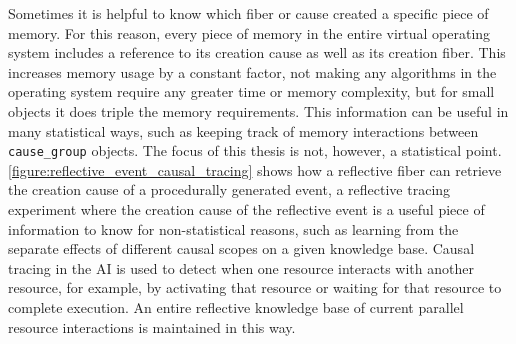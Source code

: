 Sometimes it is helpful to know which fiber or cause created a
specific piece of memory.  For this reason, every piece of memory in
the entire virtual operating system includes a reference to its
creation cause as well as its creation fiber.  This increases memory
usage by a constant factor, not making any algorithms in the operating
system require any greater time or memory complexity, but for small
objects it does triple the memory requirements.  This information can
be useful in many statistical ways, such as keeping track of memory
interactions between {\tt{cause\_group}} objects.  The focus of this
thesis is not, however, a statistical point.
{\mbox{\autoref{figure:reflective_event_causal_tracing}}} shows how a
reflective fiber can retrieve the creation cause of a procedurally
generated event, a reflective tracing experiment where the creation
cause of the reflective event is a useful piece of information to know
for non-statistical reasons, such as learning from the separate
effects of different causal scopes on a given knowledge base.  Causal
tracing in the AI is used to detect when one resource interacts with
another resource, for example, by activating that resource or waiting
for that resource to complete execution.  An entire reflective
knowledge base of current parallel resource interactions is maintained
in this way.
